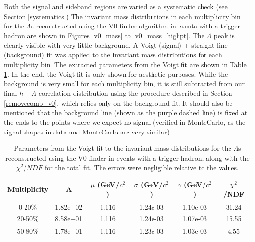 \documentclass[ALICE,manyauthors]{ALICE_analysis_notes}
\begin{document}
Both the signal and sideband regions are varied as a systematic check (see Section \ref{systematics})
The invariant mass distributions in each multiplicity bin for the $\Lambda$s reconstructed using the V0 finder algorithm in events with a trigger hadron are shown in Figures \ref{v0_mass} to \ref{v0_mass_highpt}. The $\Lambda$ peak is clearly visible with very little background. A Voigt (signal) + straight line (background) fit was applied to the invariant mass distributions for each multiplicity bin. The extracted parameters from the Voigt fit are shown in Table \ref{voigt_parameters}. In the end, the Voigt fit is only shown for aesthetic purposes. While the background is very small for each multiplicity bin, it is still subtracted from our final $h-\Lambda$ correlation distribution using the procedure described in Section \ref{removecomb_v0}, which relies only on the background fit. It should also be mentioned that the background line (shown as the purple dashed line) is fixed at the ends to the points where we expect no signal (verified in MonteCarlo, as the signal shapes in data and MonteCarlo are very similar).

\begin{table}[h!]
\centering
\begin{tabular}{| c || c | c | c | c | c | }
\hline
Multiplicity & A & $\mu$ (GeV/$c^2$) & $\sigma$ (GeV/$c^2$) & $\gamma$ (GeV/$c^2$) & $\chi^2$/NDF \\
\hline
0-20\% & 1.82e+02  & 1.116 & 1.24e-03 & 1.10e-03 & 31.24\\
20-50\% & 8.58e+01 & 1.116 & 1.24e-03 & 1.07e-03 & 15.55\\
50-80\% & 1.78e+01 & 1.116 & 1.23e-03 & 1.03e-03 & 4.55\\
\hline
\end{tabular}
\caption{Parameters from the Voigt fit to the invariant mass distributions for the $\Lambda$s reconstructed using the V0 finder in events with a trigger hadron, along with the $\chi^2/NDF$ for the total fit. The errors were negligible relative to the values.}
\label{voigt_parameters}
\end{table}

\clearpage
 
\end{document}
